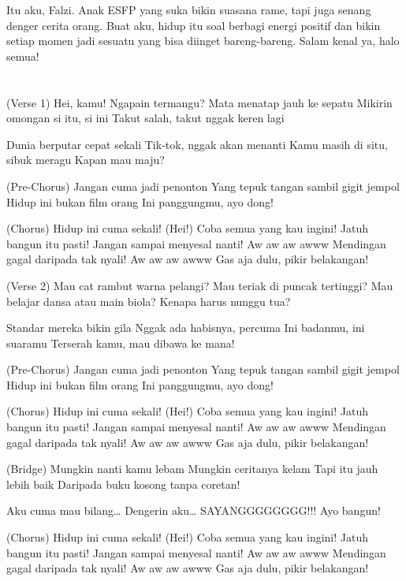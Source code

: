 \documentclass[
  letterpaper,
  DIV=11,
  numbers=noendperiod]{scrreprt}
\begin{document}
Itu aku, Falzi. Anak ESFP yang suka bikin suasana rame, tapi juga senang
denger cerita orang. Buat aku, hidup itu soal berbagi energi positif dan
bikin setiap momen jadi sesuatu yang bisa diinget bareng-bareng. Salam
kenal ya, halo semua!


\chapter{}\label{section}

(Verse 1) Hei, kamu! Ngapain termangu? Mata menatap jauh ke sepatu
Mikirin omongan si itu, si ini Takut salah, takut nggak keren lagi

Dunia berputar cepat sekali Tik-tok, nggak akan menanti Kamu masih di
situ, sibuk meragu Kapan mau maju?

(Pre-Chorus) Jangan cuma jadi penonton Yang tepuk tangan sambil gigit
jempol Hidup ini bukan film orang Ini panggungmu, ayo dong!

(Chorus) Hidup ini cuma sekali! (Hei!) Coba semua yang kau ingini! Jatuh
bangun itu pasti! Jangan sampai menyesal nanti! Aw aw aw awww Mendingan
gagal daripada tak nyali! Aw aw aw awww Gas aja dulu, pikir belakangan!

(Verse 2) Mau cat rambut warna pelangi? Mau teriak di puncak tertinggi?
Mau belajar dansa atau main biola? Kenapa harus nunggu tua?

Standar mereka bikin gila Nggak ada habisnya, percuma Ini badanmu, ini
suaramu Terserah kamu, mau dibawa ke mana!

(Pre-Chorus) Jangan cuma jadi penonton Yang tepuk tangan sambil gigit
jempol Hidup ini bukan film orang Ini panggungmu, ayo dong!

(Chorus) Hidup ini cuma sekali! (Hei!) Coba semua yang kau ingini! Jatuh
bangun itu pasti! Jangan sampai menyesal nanti! Aw aw aw awww Mendingan
gagal daripada tak nyali! Aw aw aw awww Gas aja dulu, pikir belakangan!

(Bridge) Mungkin nanti kamu lebam Mungkin ceritanya kelam Tapi itu jauh
lebih baik Daripada buku kosong tanpa coretan!

Aku cuma mau bilang\ldots{} Dengerin aku\ldots{} SAYANGGGGGGGG!!! Ayo
bangun!

(Chorus) Hidup ini cuma sekali! (Hei!) Coba semua yang kau ingini! Jatuh
bangun itu pasti! Jangan sampai menyesal nanti! Aw aw aw awww Mendingan
gagal daripada tak nyali! Aw aw aw awww Gas aja dulu, pikir belakangan!
\end{document}
